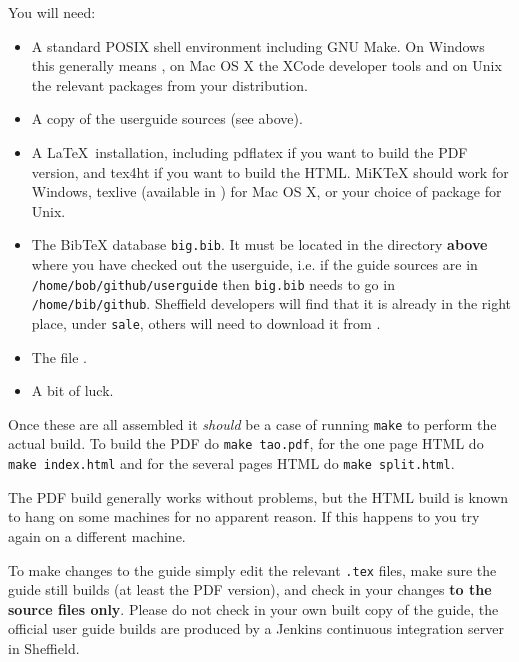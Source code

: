 You will need:
\begin{itemize}
\item
A standard POSIX shell environment including GNU Make.  On Windows this
generally means , on Mac OS X the XCode
developer tools and on Unix the relevant packages from your distribution.
\item
A copy of the userguide sources (see above).
\item
A \LaTeX\ installation, including pdflatex if you want to build the PDF
version, and tex4ht if you want to build the HTML.  MiKTeX should work for
Windows, texlive (available in ) for
Mac OS X, or your choice of package for Unix.
\item
The BibTeX database \texttt{big.bib}.  It must be located in the directory
\textbf{above} where you have checked out the userguide, i.e. if the guide
sources are in \verb|/home/bob/github/userguide| then \texttt{big.bib} needs to go
in \verb|/home/bib/github|.  Sheffield developers will find that it is already in
the right place, under \texttt{sale}, others will need to download it from
.
\item
The file .
\item
A bit of luck.
\end{itemize}

Once these are all assembled it \emph{should} be a case of running
\texttt{make} to perform the actual build.  To build the PDF do
\texttt{make tao.pdf}, for the one page HTML do \texttt{make index.html} and
for the several pages HTML do \texttt{make split.html}.

The PDF build generally works without problems, but the HTML build is known to
hang on some machines for no apparent reason.  If this happens to you try again
on a different machine.


To make changes to the guide simply edit the relevant \texttt{.tex} files, make
sure the guide still builds (at least the PDF version), and check in your
changes \textbf{to the source files only}.  Please do not check in your own
built copy of the guide, the official user guide builds are produced by a
Jenkins continuous integration server in Sheffield.

